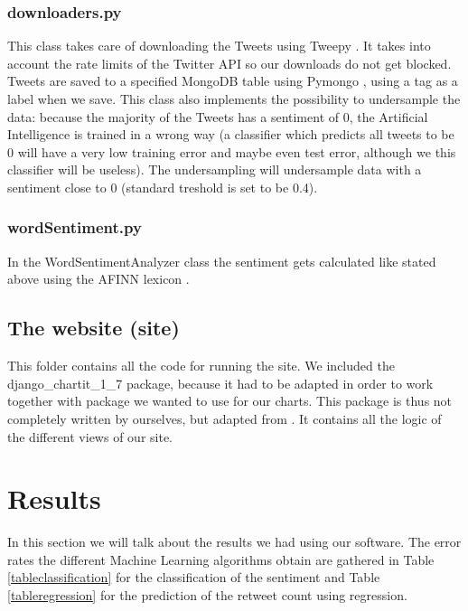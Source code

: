 \documentclass[10pt]{IEEEtran}
\begin{document}
\subsubsection{downloaders.py}

This class takes care of downloading the Tweets using Tweepy \cite{tweepy}. It takes into account the rate limits of the Twitter API so our downloads do not get blocked. Tweets are saved to a specified MongoDB table using Pymongo \cite{pymongo}, using a tag as a label when we save. This class also implements the possibility to undersample the data: because the majority of the Tweets has a sentiment of 0, the Artificial Intelligence is trained in a wrong way (a classifier which predicts all tweets to be 0 will have a very low training error and maybe even test error, although we this classifier will be useless). The undersampling  will undersample data with a sentiment close to 0 (standard treshold is set to be 0.4). 

\subsubsection{wordSentiment.py}

In the WordSentimentAnalyzer class the sentiment gets calculated like stated above using the AFINN lexicon \cite{AFINN}. 

\subsection{The website (site)}

This folder contains all the code for running the site. We included the django\_chartit\_1\_7 package, because it had to be adapted in order to work together with package we wanted to use for our charts. This package is thus not completely written by ourselves, but adapted from \cite{django}. It contains all the logic of the different views of our site.

\section{Results}

In this section we will talk about the results we had using our software. The error rates the different Machine Learning algorithms obtain are gathered in Table \ref{tableclassification} for the classification of the sentiment and Table \ref{tableregression} for the prediction of the retweet count using regression. 
\end{document}
